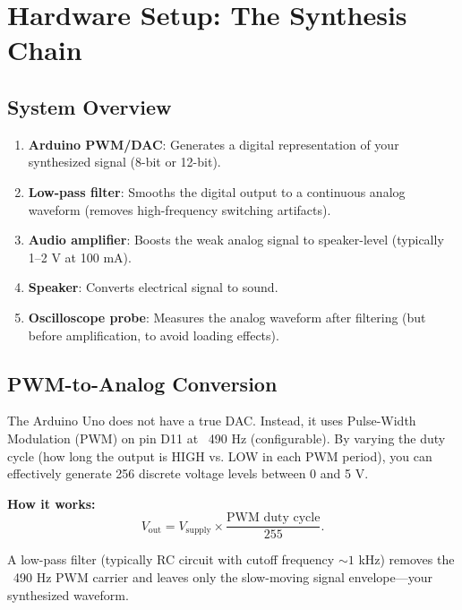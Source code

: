 \documentclass[11pt,letterpaper]{article}
\begin{document}
\clearpage

\section{Hardware Setup: The Synthesis Chain}

\subsection{System Overview}

\begin{enumerate}
    \item \textbf{Arduino PWM/DAC}: Generates a digital representation of your synthesized signal (8-bit or 12-bit).
    \item \textbf{Low-pass filter}: Smooths the digital output to a continuous analog waveform (removes high-frequency switching artifacts).
    \item \textbf{Audio amplifier}: Boosts the weak analog signal to speaker-level (typically 1--2 V at 100 mA).
    \item \textbf{Speaker}: Converts electrical signal to sound.
    \item \textbf{Oscilloscope probe}: Measures the analog waveform after filtering (but before amplification, to avoid loading effects).
\end{enumerate}

\subsection{PWM-to-Analog Conversion}

The Arduino Uno does not have a true DAC. Instead, it uses Pulse-Width Modulation (PWM) on pin D11 at ~490 Hz (configurable). By varying the duty cycle (how long the output is HIGH vs. LOW in each PWM period), you can effectively generate 256 discrete voltage levels between 0 and 5 V.

\textbf{How it works:}
\begin{equation}
V_{\text{out}} = V_{\text{supply}} \times \frac{\text{PWM duty cycle}}{255}.
\end{equation}

A low-pass filter (typically RC circuit with cutoff frequency $\sim 1$ kHz) removes the ~490 Hz PWM carrier and leaves only the slow-moving signal envelope—your synthesized waveform.
\end{document}
